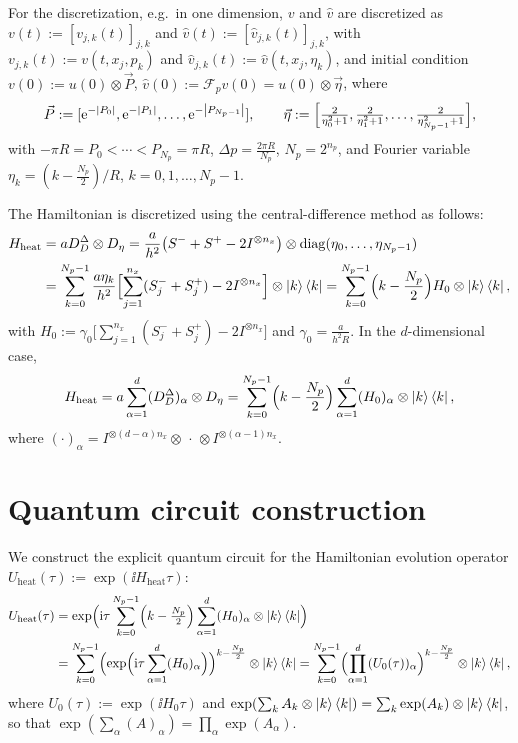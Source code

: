 For the discretization, e.g.\ in one dimension, $v$ and $\hat{v}$ are discretized
as $v(t) := [v_{j,k}(t)]_{j,k}$ and $\hat{v}(t) := [\hat{v}_{j,k}(t)]_{j,k}$, with
$v_{j,k}(t) := v(t, x_j, p_k)$ and $\hat{v}_{j,k}(t) := \hat{v}(t, x_j, \eta_k)$,
and initial condition $v(0) := u(0) \otimes \vec{P}$,
$\hat{v}(0) := \mathcal{F}_p v(0) = u(0) \otimes \vec{\eta}$, where
\begin{equation}
  \vec{P} := [\mathrm{e}^{-\left\lvert P_0 \right\rvert}, \mathrm{e}^{-\left\lvert P_1 \right\rvert}, \dots, \mathrm{e}^{-\left\lvert P_{N_p - 1} \right\rvert}], \qquad
  \vec{\eta} := \Bigl[\tfrac{2}{\eta_0^2 + 1}, \tfrac{2}{\eta_1^2 + 1}, \dots, \tfrac{2}{\eta_{N_p-1}^2 + 1}\Bigr],
\end{equation}
with $-\pi R = P_0 < \cdots < P_{N_p} = \pi R$, $\Delta p = \tfrac{2\pi R}{N_p}$,
$N_p = 2^{n_p}$, and Fourier variable $\eta_k = (k - \tfrac{N_p}{2})/R$,
$k = 0, 1, \dots, N_p - 1$.

The Hamiltonian is discretized using the central-difference method as follows:
\begin{align}
  H_{\mathrm{heat}} &= a D_D^{\Delta} \otimes D_\eta
    = \frac{a}{h^2}\bigl(S^- + S^+ - 2I^{\otimes n_x}\bigr) \otimes \operatorname{diag}(\eta_0, \dots, \eta_{N_p - 1}) \notag\\
  &= \sum_{k=0}^{N_p - 1} \frac{a\eta_k}{h^2}\Bigl[\sum_{j=1}^{n_x}(S_j^- + S_j^+) - 2I^{\otimes n_x}\Bigr] \otimes \ket{k}\bra{k}
    = \sum_{k=0}^{N_p - 1}\Bigl(k - \frac{N_p}{2}\Bigr) H_0 \otimes \ket{k}\bra{k},
\end{align}
with $H_0 := \gamma_0\bigl[\sum_{j=1}^{n_x}(S_j^- + S_j^+) - 2I^{\otimes n_x}\bigr]$
and $\gamma_0 = \tfrac{a}{h^2 R}$. In the $d$-dimensional case,
\begin{equation}
  H_{\mathrm{heat}} = a\sum_{\alpha=1}^d (D_D^{\Delta})_\alpha \otimes D_\eta
  = \sum_{k=0}^{N_p-1}\Bigl(k - \frac{N_p}{2}\Bigr)\sum_{\alpha=1}^d (H_0)_\alpha \otimes \ket{k}\bra{k},
\end{equation}
where $(\cdot)_\alpha = I^{\otimes(d-\alpha)n_x} \otimes\, \cdot\, \otimes I^{\otimes(\alpha-1)n_x}$.

\section{Quantum circuit construction}\label{sec:sec06-circuit}

We construct the explicit quantum circuit for the Hamiltonian evolution operator
$U_{\mathrm{heat}}(\tau) := \exp(\ii H_{\mathrm{heat}}\tau)$:
\begin{align}
  U_{\mathrm{heat}}(\tau)
  &= \exp\Bigl(\mathrm{i}\tau\sum_{k=0}^{N_p - 1}\Bigl(k - \tfrac{N_p}{2}\Bigr)\sum_{\alpha=1}^d (H_0)_\alpha \otimes \ket{k}\bra{k}\Bigr) \notag\\
  &= \sum_{k=0}^{N_p - 1}\Bigl(\exp\Bigl(\mathrm{i}\tau\sum_{\alpha=1}^d (H_0)_\alpha\Bigr)\Bigr)^{k - \frac{N_p}{2}} \otimes \ket{k}\bra{k}
   = \sum_{k=0}^{N_p - 1}\Bigl(\prod_{\alpha=1}^d (U_0(\tau))_\alpha\Bigr)^{k - \frac{N_p}{2}} \otimes \ket{k}\bra{k},
\end{align}
where $U_0(\tau) := \exp(\ii H_0\tau)$ and
$\exp(\sum_k A_k \otimes \ket{k}\bra{k}) = \sum_k \exp(A_k) \otimes \ket{k}\bra{k}$,
so that $\exp(\sum_\alpha (A)_\alpha) = \prod_\alpha \exp(A_\alpha)$.

